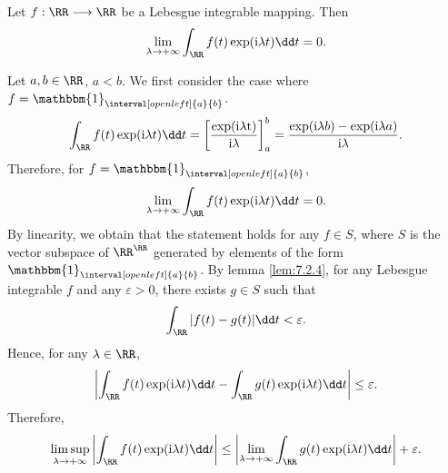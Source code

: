 \begin{lemmaenv}\label{lem:8.5.7}
    Let $f : \RR \longrightarrow \RR$ be a Lebesgue integrable mapping.
    Then
    $$\lim_{\lambda \to + \infty} \int_{\RR} f(t) \exp(\mathrm{i} \lambda t) \dd t = 0.$$
\end{lemmaenv}
\begin{proofenv}
    Let $a,b \in \RR$, $a<b$.
    We first consider the case where $f = \mathbbm{1}_{\interval[open left]{a}{b}}$.
    $$\int_{\RR} f(t) \exp(\mathrm{i} \lambda t) \dd t = \left[\frac{\exp(\mathrm{i \lambda t})}{\mathrm{i} \lambda}\right]^{b}_{a} = \frac{\exp(\mathrm{i} \lambda b) - \exp(\mathrm{i}\lambda a)}{\mathrm{i} \lambda}.$$
    Therefore, for $f = \mathbbm{1}_{\interval[open left]{a}{b}}$,
    $$\lim_{\lambda \to + \infty} \int_{\RR} f(t) \exp(\mathrm{i} \lambda t) \dd t = 0.$$
    By linearity, we obtain that the statement holds for any $f \in S$, where $S$ is the vector subspace of $\RR^\RR$ generated by elements of the form $\mathbbm{1}_{\interval[open left]{a}{b}}$.
    By lemma \ref{lem:7.2.4}, for any Lebesgue integrable $f$ and any $\varepsilon > 0$, there exists $g \in S$ such that
    $$\int_{\RR} |f(t) - g(t)| \dd t < \varepsilon.$$
    Hence, for any $\lambda \in \RR$,
    $$\left|\int_{\RR} f(t) \exp(\mathrm{i} \lambda t) \dd t - \int_{\RR} g(t) \exp(\mathrm{i} \lambda t) \dd t\right| \le \varepsilon.$$
    Therefore,
    $$\limsup_{\lambda \rightarrow +\infty} \left|\int_{\RR} f(t) \exp(\mathrm{i} \lambda t) \dd t\right| \le \left|\lim_{\lambda \rightarrow + \infty} \int_{\RR} g(t) \exp(\mathrm{i} \lambda t) \dd t\right| + \varepsilon.$$
\end{proofenv}

